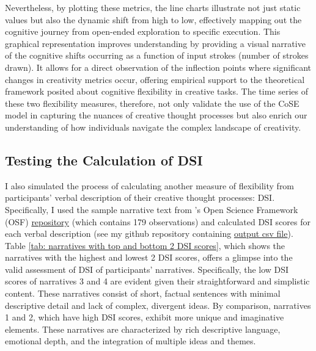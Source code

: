\documentclass[../Proposal_Writing_Sample.tex]{subfiles}
\begin{document}
Nevertheless, by plotting these metrics, the line charts illustrate not just static values but also the dynamic shift from high to low, effectively mapping out the cognitive journey from open-ended exploration to specific execution. This graphical representation improves understanding by providing a visual narrative of the cognitive shifts occurring as a function of input strokes (number of strokes drawn). It allows for a direct observation of the inflection points where significant changes in creativity metrics occur, offering empirical support to the theoretical framework posited about cognitive flexibility in creative tasks. The time series of these two flexibility measures, therefore, not only validate the use of the CoSE model in capturing the nuances of creative thought processes but also enrich our understanding of how individuals navigate the complex landscape of creativity.

\subsection*{Testing the Calculation of DSI}
I also simulated the process of calculating another measure of flexibility from participants' verbal description of their creative thought processes: DSI. Specifically, I used the sample narrative text from \textcite{johnson_divergent_2022}'s Open Science Framework (OSF) \href{https://osf.io/ath2s/}{repository} (which contains 179 observations) and calculated DSI scores for each verbal description (see my github repository containing \href{https://github.com/cty20010831/UChicago_MA_Thesis_Divergent-Semantic-Integration/blob/bdd32706afb7ba8e72f07b3b10d1eaa9fe8b4331/user_text/DSI_output.csv.csv}{output csv file}). Table \ref{tab: narratives with top and bottom 2 DSI scores}, which shows the narratives with the highest and lowest 2 DSI scores, offers a glimpse into the valid assessment of DSI of participants' narratives. Specifically, the low DSI scores of narratives 3 and 4 are evident given their straightforward and simplistic content. These narratives consist of short, factual sentences with minimal descriptive detail and lack of complex, divergent ideas. By comparison, narratives 1 and 2, which have high DSI scores, exhibit more unique and imaginative elements. These narratives are characterized by rich descriptive language, emotional depth, and the integration of multiple ideas and themes. 
\end{document}
